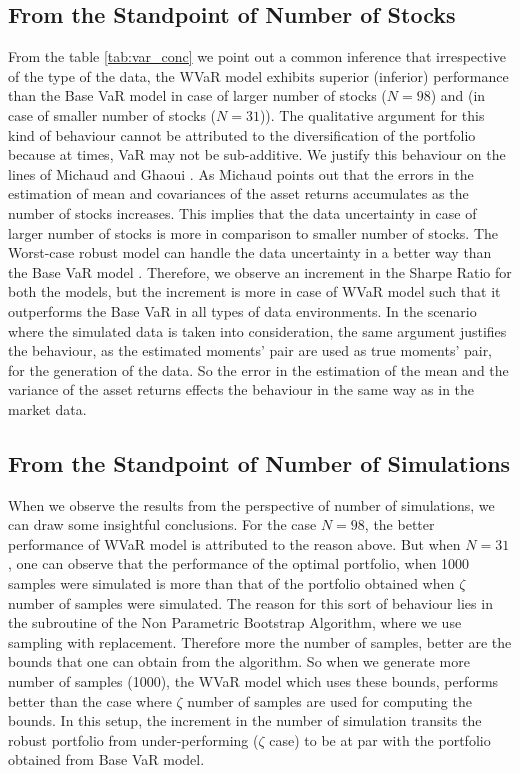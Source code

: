 \subsection{From the Standpoint of Number of Stocks}

From the table \ref{tab:var_conc} we point out a common inference that irrespective of the type of the data, the WVaR model exhibits superior (inferior) performance than the Base VaR model in case of larger number of stocks ($N=98$) and (in case of smaller number of stocks ($N=31$)). The qualitative argument for this kind of behaviour cannot be attributed to the diversification of the portfolio because at times, VaR may not be sub-additive. We justify this behaviour on the lines of Michaud \cite{Michaud} and Ghaoui \cite{Michaud}. As Michaud points out that the errors in the estimation of mean and covariances of the asset returns accumulates as the number of stocks increases. This implies that the data uncertainty in case of larger number of stocks is more in comparison to smaller number of stocks. The Worst-case robust model can handle the data uncertainty in a better way than the Base VaR model \cite{ghaoui03}. Therefore, we observe an increment in the Sharpe Ratio for both the models, but the increment is more in case of WVaR model such that it outperforms the Base VaR in all types of data environments. In the scenario where the simulated data is taken into consideration, the same argument justifies the behaviour, as the estimated moments' pair are used as true moments' pair, for the generation of the data. So the error in the estimation of the mean and the variance of the asset returns effects the behaviour in the same way as in the market data.

\subsection{From the Standpoint of Number of Simulations}

When we observe the results from the perspective of number of simulations, we can draw some insightful conclusions. For the case $N=98$, the better performance of WVaR model is attributed to the reason above. But when $N=31$, one can observe that the performance of the optimal portfolio, when 1000 samples were simulated is more than that of the portfolio obtained when $\zeta$ number of samples were simulated. The reason for this sort of behaviour lies in the subroutine of the Non Parametric Bootstrap Algorithm, where we use sampling with replacement. Therefore more the number of samples, better are the bounds that one can obtain from the algorithm. So when we generate more number of samples (1000), the WVaR model which uses these bounds, performs better than the case where $\zeta$ number of samples are used for computing the bounds. In this setup, the increment in the number of simulation transits the robust portfolio from under-performing ($\zeta$ case) to be at par with the portfolio obtained from Base VaR model.


